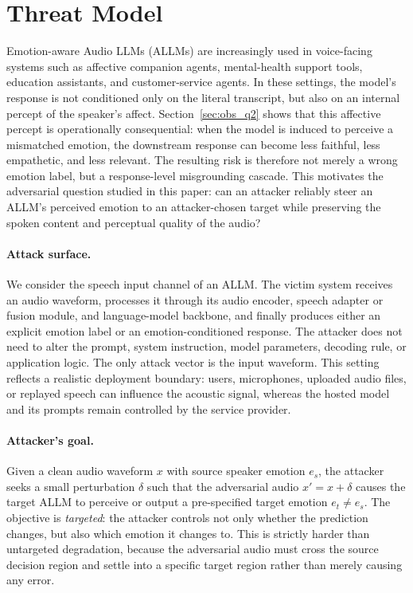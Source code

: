 
\section{Threat Model}
\label{sec:threat_model}

Emotion-aware Audio LLMs (ALLMs) are increasingly used in voice-facing systems such as affective companion agents, mental-health support tools, education assistants, and customer-service agents. In these settings, the model's response is not conditioned only on the literal transcript, but also on an internal percept of the speaker's affect. Section~\ref{sec:obs_q2} shows that this affective percept is operationally consequential: when the model is induced to perceive a mismatched emotion, the downstream response can become less faithful, less empathetic, and less relevant. The resulting risk is therefore not merely a wrong emotion label, but a response-level misgrounding cascade. This motivates the adversarial question studied in this paper: can an attacker reliably steer an ALLM's perceived emotion to an attacker-chosen target while preserving the spoken content and perceptual quality of the audio?

\paragraph{Attack surface.}
We consider the speech input channel of an ALLM. The victim system receives an audio waveform, processes it through its audio encoder, speech adapter or fusion module, and language-model backbone, and finally produces either an explicit emotion label or an emotion-conditioned response. The attacker does not need to alter the prompt, system instruction, model parameters, decoding rule, or application logic. The only attack vector is the input waveform. This setting reflects a realistic deployment boundary: users, microphones, uploaded audio files, or replayed speech can influence the acoustic signal, whereas the hosted model and its prompts remain controlled by the service provider.

\paragraph{Attacker's goal.}
Given a clean audio waveform $x$ with source speaker emotion $e_s$, the attacker seeks a small perturbation $\delta$ such that the adversarial audio $x'=x+\delta$ causes the target ALLM to perceive or output a pre-specified target emotion $e_t\neq e_s$. The objective is \emph{targeted}: the attacker controls not only whether the prediction changes, but also which emotion it changes to. This is strictly harder than untargeted degradation, because the adversarial audio must cross the source decision region and settle into a specific target region rather than merely causing any error.

